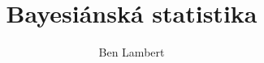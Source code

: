 \documentclass[a4paper]{book}
\begin{document}
\newtheorem{definition}{Definice}[chapter]
\newtheorem{theorem}{Věta}[chapter]
\newtheorem{proof}{Důkaz}[chapter]
\newtheorem{example}{Příklad}[chapter]
\newtheorem{corollary}{Tvrzení}[chapter]
\newtheorem{assumption}{Předpoklad}[chapter]


\title{Bayesiánská statistika}
\author{Ben Lambert}
\maketitle

\tableofcontents


\end{document}
